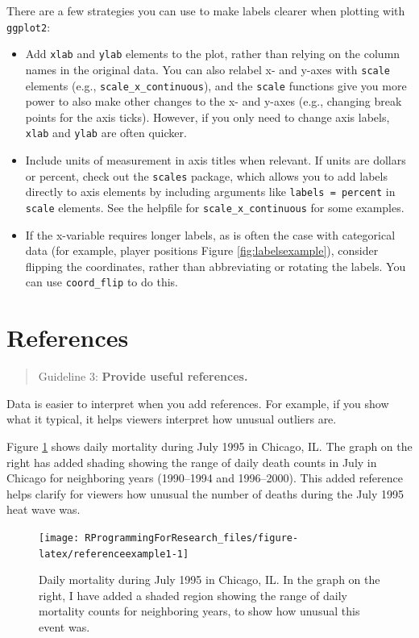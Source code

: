 \documentclass[]{book}
\providecommand{\tightlist}{%
  \setlength{\itemsep}{0pt}\setlength{\parskip}{0pt}}
\theoremstyle{definition}
\theoremstyle{definition}
\theoremstyle{definition}
\theoremstyle{remark}
\begin{document}
There are a few strategies you can use to make labels clearer when
plotting with \texttt{ggplot2}:

\begin{itemize}
\tightlist
\item
  Add \texttt{xlab} and \texttt{ylab} elements to the plot, rather than
  relying on the column names in the original data. You can also relabel
  x- and y-axes with \texttt{scale} elements (e.g.,
  \texttt{scale\_x\_continuous}), and the \texttt{scale} functions give
  you more power to also make other changes to the x- and y-axes (e.g.,
  changing break points for the axis ticks). However, if you only need
  to change axis labels, \texttt{xlab} and \texttt{ylab} are often
  quicker.
\item
  Include units of measurement in axis titles when relevant. If units
  are dollars or percent, check out the \texttt{scales} package, which
  allows you to add labels directly to axis elements by including
  arguments like \texttt{labels\ =\ percent} in \texttt{scale} elements.
  See the helpfile for \texttt{scale\_x\_continuous} for some examples.
\item
  If the x-variable requires longer labels, as is often the case with
  categorical data (for example, player positions Figure
  \ref{fig:labelsexample}), consider flipping the coordinates, rather
  than abbreviating or rotating the labels. You can use
  \texttt{coord\_flip} to do this.
\end{itemize}

\section{References}\label{references}

\begin{quote}
Guideline 3: \textbf{Provide useful references.}
\end{quote}

Data is easier to interpret when you add references. For example, if you
show what it typical, it helps viewers interpret how unusual outliers
are.

Figure \ref{fig:referenceexample1} shows daily mortality during July
1995 in Chicago, IL. The graph on the right has added shading showing
the range of daily death counts in July in Chicago for neighboring years
(1990--1994 and 1996--2000). This added reference helps clarify for
viewers how unusual the number of deaths during the July 1995 heat wave
was.

\begin{figure}

{\centering \texttt{[image: RProgrammingForResearch\_files/figure-latex/referenceexample1-1]} 

}

\caption{Daily mortality during July 1995 in Chicago, IL. In the graph on the right, I have added a shaded region showing the range of daily mortality counts for neighboring years, to show how unusual this event was.}\label{fig:referenceexample1}
\end{figure}
\end{document}
